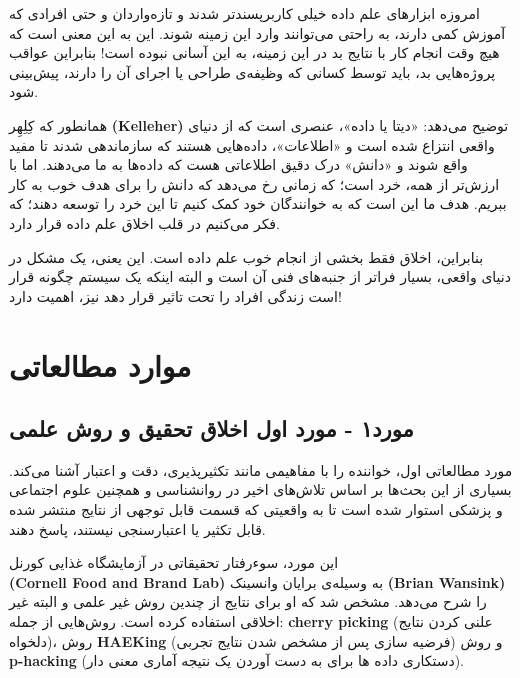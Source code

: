 امروزه ابزارهای علم داده خیلی کاربرپسندتر شدند و تازه‌واردان و حتی افرادی که آموزش کمی دارند، به راحتی می‌توانند وارد این زمینه شوند.
این به این معنی است که هیچ وقت انجام کار با نتایج بد در این زمینه، به این آسانی نبوده است!
بنابراین عواقب پروژه‌هایی بد، باید توسط کسانی که وظیفه‌ی طراحی یا اجرای آن را دارند، پیش‌بینی شود.

همانطور که کِلِهِر \textenglish{\textbf{(Kelleher)}} توضیح می‌دهد: «دیتا یا داده»، عنصری است که از دنیای واقعی انتزاع شده است و «اطلاعات»، داده‌هایی هستند که سازماندهی شدند تا مفید واقع شوند و «دانش» درک دقیق اطلاعاتی هست که داده‌ها به ما می‌دهند.
اما با ارزش‌تر از همه، خرد است؛ که زمانی رخ می‌دهد که دانش را برای هدف خوب به کار ببریم.
هدف ما این است که به خوانندگان خود کمک کنیم تا این خرد را توسعه دهند؛ که فکر می‌کنیم در قلب اخلاق علم داده قرار دارد.

بنابراین، اخلاق فقط بخشی از انجام خوب علم داده است.
این یعنی، یک مشکل در دنیای واقعی، بسیار فراتر از جنبه‌های فنی آن است و البته اینکه یک سیستم چگونه قرار است زندگی افراد را تحت تاثیر قرار دهد نیز، اهمیت دارد!
\newline
\newline

{
\section*{موارد مطالعاتی}
\label{sec:موارد مطالعاتی}


\subsection*{مورد۱ - مورد اول اخلاق تحقیق و روش علمی}
\label{subsec:مورد۱ - مورد اول اخلاق تحقیق و روش علمی}
مورد مطالعاتی اول، خواننده را با مفاهیمی مانند تکثیرپذیری، دقت و اعتبار آشنا می‌کند.
بسیاری از این بحث‌ها بر اساس تلاش‌های اخیر در روانشناسی و همچنین علوم اجتماعی و پزشکی استوار شده است تا به واقعیتی که قسمت قابل توجهی از نتایج منتشر شده قابل تکثیر یا اعتبارسنجی نیستند، پاسخ دهند.
}
\newpage

این مورد، سوءرفتار تحقیقاتی در آزمایشگاه غذایی کورنل \\ \textenglish{\textbf{(Cornell Food and Brand Lab)}} به وسیله‌ی برایان وانسینک \textenglish{\textbf{(Brian Wansink)}} را شرح می‌دهد.
مشخص شد که او برای نتایج از چندین روش غیر علمی و البته غیر اخلاقی استفاده کرده است.
روش‌هایی از جمله: \textenglish{\textbf{cherry picking}} (علنی کردن نتایج دلخواه)، روش \textenglish{\textbf{HAEKing}} (فرضیه سازی پس از مشخص شدن نتایج تجربی) و روش \textenglish{\textbf{p-hacking}} (دستکاری داده ها برای به دست آوردن یک نتیجه آماری معنی دار).

